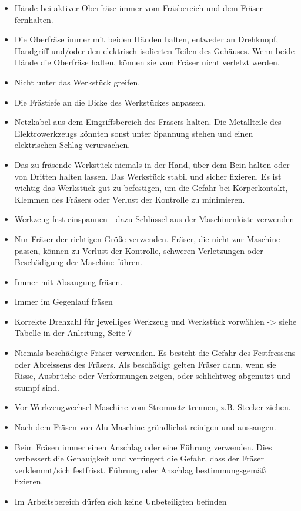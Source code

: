 \documentclass{\basedir/fablab-document}
\begin{document}
\begin{itemize}
\item Hände bei aktiver Oberfräse immer vom Fräsbereich und dem Fräser fernhalten.
\item Die Oberfräse immer mit beiden Händen halten, entweder an Drehknopf, Handgriff und/oder den elektrisch isolierten Teilen des Gehäuses. Wenn beide Hände die Oberfräse halten, können sie vom Fräser nicht verletzt werden.
\item Nicht unter das Werkstück greifen.
\item Die Frästiefe an die Dicke des Werkstückes anpassen.
\item Netzkabel aus dem Eingriffsbereich des Fräsers halten. Die Metallteile des Elektrowerkzeugs könnten sonst unter Spannung stehen und einen elektrischen Schlag verursachen.
\item Das zu fräsende Werkstück niemals in der Hand, über dem Bein halten oder von Dritten halten lassen. Das Werkstück stabil und sicher fixieren. Es ist wichtig das Werkstück gut zu befestigen, um die Gefahr bei Körperkontakt, Klemmen des Fräsers oder Verlust der Kontrolle zu minimieren.
\item Werkzeug fest einspannen - dazu Schlüssel aus der Maschinenkiste verwenden
\item Nur Fräser der richtigen Größe verwenden. Fräser, die nicht zur Maschine passen, können zu Verlust der Kontrolle, schweren Verletzungen oder Beschädigung der Maschine führen.
\item Immer mit Absaugung fräsen.
\item Immer im Gegenlauf fräsen
\item Korrekte Drehzahl für jeweiliges Werkzeug und Werkstück vorwählen -> siehe Tabelle in der Anleitung, Seite 7
\item Niemals beschädigte Fräser verwenden. Es besteht die Gefahr des Festfressens oder Abreissens des Fräsers. Als beschädigt gelten Fräser dann, wenn sie Risse, Ausbrüche oder Verformungen zeigen, oder schlichtweg abgenutzt und stumpf sind.
\item Vor Werkzeugwechsel Maschine vom Stromnetz trennen, z.B. Stecker ziehen.
\item Nach dem Fräsen von Alu Maschine gründlichst reinigen und aussaugen.
\item Beim Fräsen immer einen Anschlag oder eine Führung verwenden. Dies verbessert die Genauigkeit und verringert die Gefahr, dass der Fräser verklemmt/sich festfrisst. Führung oder Anschlag bestimmungsgemäß fixieren.
\item Im Arbeitsbereich dürfen sich keine Unbeteiligten befinden
\end{itemize}
\end{document}
